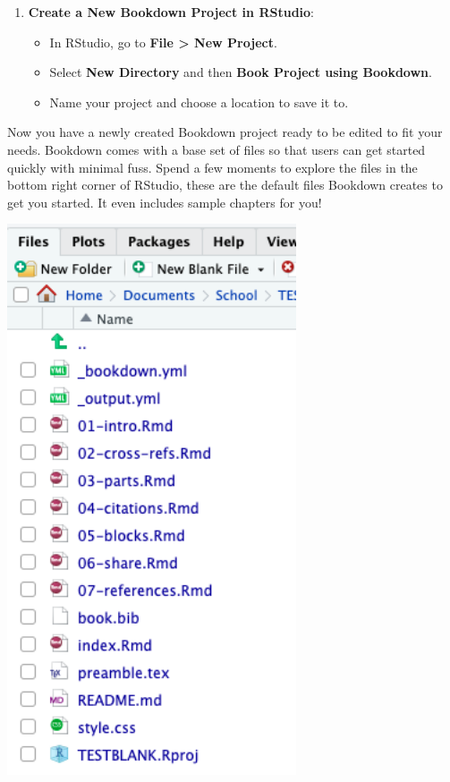 \documentclass[
]{book}
\providecommand{\tightlist}{%
  \setlength{\itemsep}{0pt}\setlength{\parskip}{0pt}}
\theoremstyle{definition}
\theoremstyle{definition}
\theoremstyle{definition}
\theoremstyle{definition}
\theoremstyle{remark}
\begin{document}
\begin{enumerate}
\def\labelenumi{\arabic{enumi}.}
\setcounter{enumi}{4}
\tightlist
\item
  \textbf{Create a New Bookdown Project in RStudio}:

  \begin{itemize}
  \tightlist
  \item
    In RStudio, go to \textbf{File \textgreater{} New Project}.
  \item
    Select \textbf{New Directory} and then \textbf{Book Project using Bookdown}.
  \item
    Name your project and choose a location to save it to.
  \end{itemize}
\end{enumerate}

Now you have a newly created Bookdown project ready to be edited to fit your needs. Bookdown comes with a base set of files so that users can get started quickly with minimal fuss. Spend a few moments to explore the files in the bottom right corner of RStudio, these are the default files Bookdown creates to get you started. It even includes sample chapters for you!

\includegraphics[width=3.36in]{images/tutorialscreenshots/filestructure}
\end{document}
